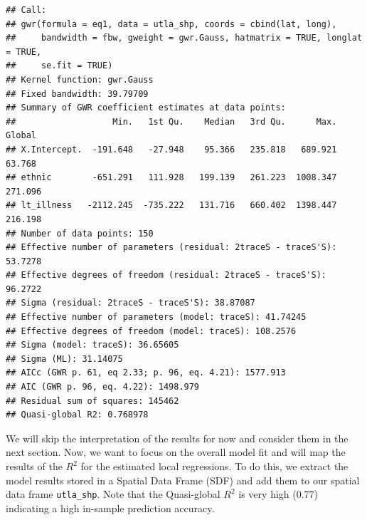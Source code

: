 \documentclass[]{book}
\begin{document}
\begin{verbatim}
## Call:
## gwr(formula = eq1, data = utla_shp, coords = cbind(lat, long), 
##     bandwidth = fbw, gweight = gwr.Gauss, hatmatrix = TRUE, longlat = TRUE, 
##     se.fit = TRUE)
## Kernel function: gwr.Gauss 
## Fixed bandwidth: 39.79709 
## Summary of GWR coefficient estimates at data points:
##                   Min.   1st Qu.    Median   3rd Qu.      Max.  Global
## X.Intercept.  -191.648   -27.948    95.366   235.818   689.921  63.768
## ethnic        -651.291   111.928   199.139   261.223  1008.347 271.096
## lt_illness   -2112.245  -735.222   131.716   660.402  1398.447 216.198
## Number of data points: 150 
## Effective number of parameters (residual: 2traceS - traceS'S): 53.7278 
## Effective degrees of freedom (residual: 2traceS - traceS'S): 96.2722 
## Sigma (residual: 2traceS - traceS'S): 38.87087 
## Effective number of parameters (model: traceS): 41.74245 
## Effective degrees of freedom (model: traceS): 108.2576 
## Sigma (model: traceS): 36.65605 
## Sigma (ML): 31.14075 
## AICc (GWR p. 61, eq 2.33; p. 96, eq. 4.21): 1577.913 
## AIC (GWR p. 96, eq. 4.22): 1498.979 
## Residual sum of squares: 145462 
## Quasi-global R2: 0.768978
\end{verbatim}

We will skip the interpretation of the results for now and consider them
in the next section. Now, we want to focus on the overall model fit and
will map the results of the \(R^{2}\) for the estimated local
regressions. To do this, we extract the model results stored in a
Spatial Data Frame (SDF) and add them to our spatial data frame
\texttt{utla\_shp}. Note that the Quasi-global \(R^{2}\) is very high
(0.77) indicating a high in-sample prediction accuracy.
\end{document}

